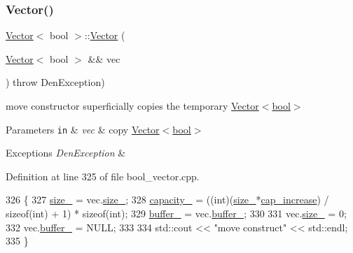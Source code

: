 \subsubsection{\texorpdfstring{Vector()}{Vector()}\hspace{0.1cm}{\footnotesize\ttfamily [5/5]}}
{\footnotesize\ttfamily \hyperlink{classVector}{Vector}$<$ bool $>$\+::\hyperlink{classVector}{Vector} (\begin{DoxyParamCaption}\item[{\hyperlink{classVector}{Vector}$<$ bool $>$ \&\&}]{vec }\end{DoxyParamCaption}) throw  Den\+Exception) }



move constructor  superficially copies the temporary \hyperlink{classVector_3_01bool_01_4}{Vector$<$bool$>$} 


\begin{DoxyParams}[1]{Parameters}
\mbox{\tt in}  & {\em vec} & copy \hyperlink{classVector_3_01bool_01_4}{Vector$<$bool$>$} \\
\hline
\end{DoxyParams}

\begin{DoxyExceptions}{Exceptions}
{\em Den\+Exception} & \\
\hline
\end{DoxyExceptions}


Definition at line 325 of file bool\+\_\+vector.\+cpp.


\begin{DoxyCode}
326     \{
327         \hyperlink{classVector_3_01bool_01_4_a07895adb41b2c819f85640e35c0d4ae0}{size\_} = vec.\hyperlink{classVector_a3c70fa478530a90177f2a7e7621ee688}{size\_};
328         \hyperlink{classVector_3_01bool_01_4_ac3da0e4580bca55cab445ed3f9c50f2d}{capacity\_} = ((int)(\hyperlink{classVector_3_01bool_01_4_a07895adb41b2c819f85640e35c0d4ae0}{size\_}*\hyperlink{classVector_3_01bool_01_4_a6fe84e4e9414012807ec5ccd49711e62}{cap\_increase}) / \textcolor{keyword}{sizeof}(int) + 1) * \textcolor{keyword}{sizeof}(int);
329         \hyperlink{classVector_3_01bool_01_4_ae2183c11de877eb13209c6a5a593604f}{buffer\_} = vec.\hyperlink{classVector_a22db58ae9e92c6014e8ac657804a035a}{buffer\_};
330 
331         vec.\hyperlink{classVector_a3c70fa478530a90177f2a7e7621ee688}{size\_} = 0;
332         vec.\hyperlink{classVector_a22db58ae9e92c6014e8ac657804a035a}{buffer\_} = NULL;
333 
334         std::cout << \textcolor{stringliteral}{"move construct"} << std::endl;
335     \}
\end{DoxyCode}


